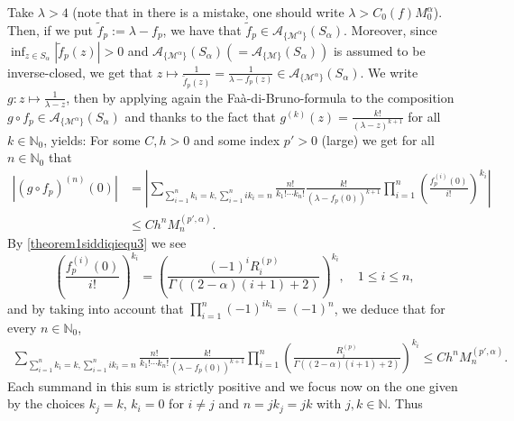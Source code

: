 \documentclass[11pt,a4paper]{article}
\theoremstyle{plain}
\theoremstyle{definition}
\newcommand{\NN}{\mathbb{N}}
\newcommand{\red}[1]{{\color{red}#1}}
\begin{document}
Take $\lambda>4$ (note that in \cite[p. 349, line 5]{Siddiqi} there is a mistake, one should write $\lambda>C_0(f)M_0^{\alpha}$).
Then, if we put $\widetilde{f}_{p}:=\lambda-f_{p}$, we have that $\widetilde{f}_p\in\mathcal{A}_{\{\mathcal{M}^{\alpha}\}}(S_{\alpha})$. Moreover, since $\inf_{z\in S_\alpha}|\widetilde{f}_{p}(z)|>0$ and $\mathcal{A}_{\{\mathcal{M}^{\alpha}\}}(S_{\alpha})(=\mathcal{A}_{\{\mathcal{M}\}}(S_{\alpha}))$ is assumed to be inverse-closed, we get that $z\mapsto\frac{1}{\widetilde{f}_{p}(z)}=\frac{1}{\lambda-f_{p}(z)}\in\mathcal{A}_{\{\mathcal{M}^{\alpha}\}}(S_{\alpha})$. We write $g:z\mapsto\frac{1}{\lambda-z}$,
then by applying again the Fa\`a-di-Bruno-formula to the composition $g\circ f_{p}\in\mathcal{A}_{\{\mathcal{M}^{\alpha}\}}(S_{\alpha})$ {and thanks to the fact that $g^{(k)}(z)=\frac{k!}{(\lambda-z)^{k+1}}$ for all $k\in\NN_0$,} yields: For some $C,h>0$ and some index $p'>0$ (large) we get for all $n\in\NN_0$ that
\begin{align*}
	|(g\circ f_{p})^{(n)}(0)|&=\left|\sum_{\sum_{i=1}^nk_i=k, \sum_{i=1}^nik_i=n}\frac{n!}{k_1!\cdots k_n!}\frac{k!}{(\lambda-f_{p}(0))^{k+1}}\prod_{i=1}^n\left(\frac{f_{p}^{(i)}(0)}{i!}\right)^{k_i}\right|\\
&\le Ch^nM^{(p',\alpha)}_n.
\end{align*}
By \eqref{theorem1siddiqiequ3} we see
$$
\left(\frac{f_{p}^{(i)}(0)}{i!}\right)^{k_i}= \left(\frac{(-1)^iR^{(p)}_i}{{\Gamma((2-\alpha)(i+1)+2)}}\right)^{k_i}, \quad 1\le i\le n,
$$
and by taking into account that $ \prod_{i=1}^n (-1)^{ik_i}=(-1)^n $, we deduce that for every $n\in\NN_0$,
\begin{align*}
\sum_{\sum_{i=1}^nk_i=k, \sum_{i=1}^nik_i=n}\frac{n!}{k_1!\cdots k_n!}\frac{k!}{(\lambda-f_{p}(0))^{k+1}} \prod_{i=1}^n\left(\frac{R^{(p)}_i}{{\Gamma((2-\alpha)(i+1)+2)}}\right)^{k_i}
\le Ch^nM^{(p',\alpha)}_n.
\end{align*}
Each summand in this sum is strictly positive and we focus now on the one given by the choices $k_j=k$, $k_i=0$ for $i\neq j$ and $n=jk_j=jk$ with $j,k\in\NN$. Thus
\end{document}

